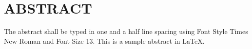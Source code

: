 \chapter*{\uppercase{ABSTRACT}}
The abstract shall be typed in one and a half line spacing using Font Style Times New Roman and Font Size 13. This is a sample abstract in LaTeX.

